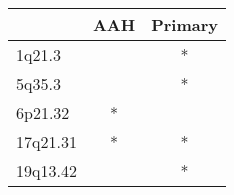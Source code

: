 \begin{tabular}{lcc}
\toprule
{} & AAH & Primary \\
\midrule
1q21.3   &     &       * \\
5q35.3   &     &       * \\
6p21.32  &   * &         \\
17q21.31 &   * &       * \\
19q13.42 &     &       * \\
\bottomrule
\end{tabular}

